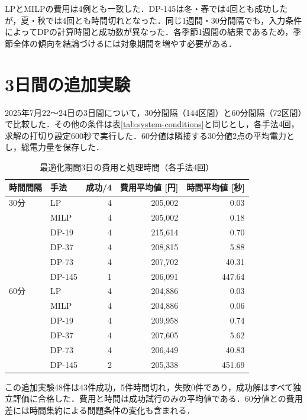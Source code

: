 \documentclass[a4paper,11pt,xelatex,ja=standard]{bxjsarticle}
\begin{document}
\endgroup


LPとMILPの費用は4例とも一致した．DP-145は冬・春では4回とも成功したが，夏・秋では4回とも時間切れとなった．同じ1週間・30分間隔でも，入力条件によってDPの計算時間と成功数が異なった．各季節1週間の結果であるため，季節全体の傾向を結論づけるには対象期間を増やす必要がある．

\clearpage
\section{3日間の追加実験}
2025年7月22～24日の3日間について，30分間隔（144区間）と60分間隔（72区間）で比較した．その他の条件は表\ref{tab:system-conditions}と同じとし，各手法4回，求解の打切り設定600秒で実行した．60分値は隣接する30分値2点の平均電力とし，総電力量を保存した．

\begin{table}[H]
    \centering
    \caption{最適化期間3日の費用と処理時間（各手法4回）}
    \label{tab:three-days}
    \begin{tabular}{llrrr}
        \toprule
        時間間隔 & 手法     & 成功/4 & 費用平均値 [円] & 時間平均値 [秒] \\
        \midrule
        30分  & LP     & 4    & 205,002   & 0.03      \\
             & MILP   & 4    & 205,002   & 0.18      \\
             & DP-19  & 4    & 215,614   & 0.70      \\
             & DP-37  & 4    & 208,815   & 5.88      \\
             & DP-73  & 4    & 207,702   & 40.31     \\
             & DP-145 & 1    & 206,091   & 447.64    \\
        \midrule
        60分  & LP     & 4    & 204,886   & 0.03      \\
             & MILP   & 4    & 204,886   & 0.06      \\
             & DP-19  & 4    & 209,958   & 0.74      \\
             & DP-37  & 4    & 207,605   & 5.62      \\
             & DP-73  & 4    & 206,449   & 40.83     \\
             & DP-145 & 2    & 205,338   & 451.69    \\
        \bottomrule
    \end{tabular}
\end{table}

この追加実験48件は43件成功，5件時間切れ，失敗0件であり，成功解はすべて独立評価に合格した．費用と時間は成功試行のみの平均値である．60分値との費用差には時間集約による問題条件の変化も含まれる．
\end{document}
